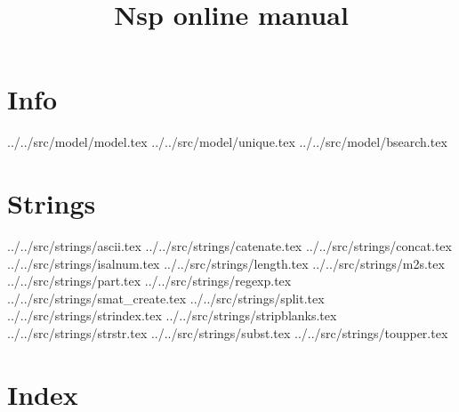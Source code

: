 \documentclass[11pt]{book}
\title{Nsp online manual}
\def\dir{../}
\begin{document}
\maketitle

\tableofcontents

\chapter{Info}

 \dir ../src/model/model.tex 
 \dir ../src/model/unique.tex 
 \dir ../src/model/bsearch.tex 

\chapter{Strings}

 \dir ../src/strings/ascii.tex
 \dir ../src/strings/catenate.tex
 \dir ../src/strings/concat.tex
 \dir ../src/strings/isalnum.tex
 \dir ../src/strings/length.tex
 \dir ../src/strings/m2s.tex
 \dir ../src/strings/part.tex
 \dir ../src/strings/regexp.tex
 \dir ../src/strings/smat_create.tex
 \dir ../src/strings/split.tex
 \dir ../src/strings/strindex.tex
 \dir ../src/strings/stripblanks.tex
 \dir ../src/strings/strstr.tex
 \dir ../src/strings/subst.tex
 \dir ../src/strings/toupper.tex
\chapter{Index}

\printindex
\end{document}
